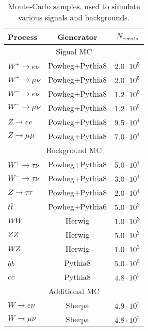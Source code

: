 \begin{table}[!tb]
\caption{Monte-Carlo samples, used to simulate various signals and backgrounds.}
\label{tab:MCSamples}
\begin{center}
\begin{tabular}{l | c | c  }
Process & Generator & $N_{events}$ \\
\hline
\multicolumn{3}{c}{Signal MC}\\
\hline
$W^{+} \to e\nu$ & Powheg+Pythia8 & $2.0\cdot10^5$ \\
$W^{+} \to \mu\nu$ & Powheg+Pythia8 & $2.0\cdot10^5$ \\
$W^{-} \to e\nu$ & Powheg+Pythia8 & $1.2\cdot10^5$ \\
$W^{-} \to \mu\nu$ & Powheg+Pythia8 &  $1.2\cdot10^5$\\
$Z \to ee$ & Powheg+Pythia8 & $9.5\cdot10^4$ \\
$Z \to \mu\mu$ & Powheg+Pythia8 &  $7.0\cdot10^4$ \\
\hline 
\hline
\multicolumn{3}{c}{Background MC} \\
\hline
$W^{+} \to \tau\nu$ & Powheg+Pythia8 & $5.0\cdot10^4$ \\
$W^{-} \to \tau\nu$ & Powheg+Pythia8 & $3.0\cdot10^4$ \\
$Z \to \tau\tau$ & Powheg+Pythia8 & $2.0\cdot10^4$  \\
$t \bar{t}$ & Powheg+Pythia6 &  $5.0\cdot10^3$\\
$WW$ & Herwig &  $1.0\cdot10^3$ \\
$ZZ$ & Herwig &   $5.0\cdot10^3$ \\
$WZ$ & Herwig &  $1.0\cdot10^3$ \\
$b\bar{b}$ & Pythia8 & $5.0 \cdot 10^5$ \\
$c\bar{c}$ & Pythia8 &  $4.8 \cdot 10^5$ \\
\hline
\hline
\multicolumn{3}{c}{Additional MC} \\
\hline
$W \to e\nu$ & Sherpa &  $4.9 \cdot 10^5$\\
$W \to \mu\nu$ & Sherpa &$4.8 \cdot 10^5$ \\
\hline
\end{tabular}
\end{center}
\end{table}